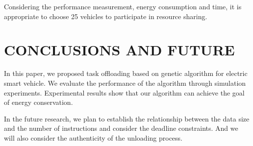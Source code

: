 \documentclass[conference]{IEEEtran}
\begin{document}
	
	
	
	Considering the performance measurement, energy consumption and time, it is appropriate to choose 25 vehicles to participate in resource sharing. 
	\section{CONCLUSIONS AND FUTURE}
	In this paper, we proposed task offloading based on genetic algorithm for electric smart vehicle. We evaluate the performance of the algorithm through simulation experiments. 
	Experimental results show that our algorithm can achieve the goal of energy conservation. 
	
	In the future research, we plan to establish the relationship between the data size and the number of instructions and consider the deadline constraints. And we will also consider the authenticity of the unloading process. 
	
	
	\printbibliography
	
\end{document}
